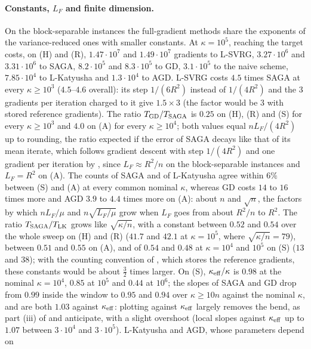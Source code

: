 \paragraph{Constants, $L_F$ and finite dimension.}
On the block-separable instances the full-gradient methods share the exponents of the variance-reduced ones with
smaller constants. At $\kappa=10^5$, reaching the target costs, on (H) and (R), $1.47\cdot10^7$ and $1.49\cdot10^7$
gradients to L-SVRG, $3.27\cdot10^6$ and $3.31\cdot10^6$ to SAGA, $8.2\cdot10^5$ and $8.3\cdot10^5$ to GD, $3.1\cdot10^5$ to the
naive scheme, $7.85\cdot10^4$ to L-Katyusha and $1.3\cdot10^4$ to AGD. L-SVRG costs $4.5$ times SAGA at every
$\kappa\ge10^3$ ($4.5$--$4.6$ overall): its step $1/(6R^2)$ instead of $1/(4R^2)$ and the $3$ gradients per iteration
charged to it give $1.5\times3$ (the factor would be $3$ with stored reference gradients). The ratio
$T_{\rm GD}/T_{\rm SAGA}$ is $0.25$ on (H), (R) and (S) for every $\kappa\ge10^3$ and $4.0$ on (A) for every
$\kappa\ge10^4$; both values equal $nL_F/(4R^2)$ up to rounding, the ratio expected if the error of SAGA decays like that of
its mean iterate, which follows gradient descent with step $1/(4R^2)$ and one gradient per iteration by
, since $L_F\approx R^2/n$ on the block-separable instances and $L_F=R^2$ on (A). The counts of SAGA and of L-Katyusha agree
within $6\%$ between (S) and (A) at every common nominal $\kappa$, whereas GD costs $14$ to $16$ times more and AGD $3.9$ to
$4.4$ times more on (A): about $n$ and $\sqrt n$, the factors by which $nL_F/\mu$ and $n\sqrt{L_F/\mu}$ grow when $L_F$ goes
from about $R^2/n$ to $R^2$. The ratio $T_{\rm SAGA}/T_{\rm LK}$ grows like $\sqrt{\kappa/n}$, with a constant between $0.52$
and $0.54$ over the whole sweep on (H) and (R) ($41.7$ and $42.1$ at $\kappa=10^5$, where $\sqrt{\kappa/n}=79$), between
$0.51$ and $0.55$ on (A), and of $0.54$ and $0.48$ at $\kappa=10^4$ and $10^5$ on (S) ($13$ and $38$); with the counting
convention of , which stores the reference gradients, these constants would be about $\frac32$ times
larger. On (S), $\kappa_{\rm eff}/\kappa$ is $0.98$ at the nominal $\kappa=10^4$, $0.85$ at $10^5$ and $0.44$ at $10^6$; the
slopes of SAGA and GD drop from $0.99$ inside the window to $0.95$ and $0.94$ over $\kappa\ge10n$ against the nominal
$\kappa$, and are both $1.03$ against $\kappa_{\rm eff}$: plotting against $\kappa_{\rm eff}$ largely removes the bend, as
part (iii) of  and  anticipate, with a slight overshoot (local slopes against
$\kappa_{\rm eff}$ up to $1.07$ between $3\cdot10^4$ and $3\cdot10^5$). L-Katyusha and AGD, whose parameters depend on
